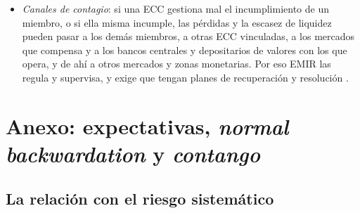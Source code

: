 \documentclass[11pt]{article}
\begin{document}
\begin{itemize}
  \begin{enumerate}
  \item el margen inicial del incumplidor y su aportación al fondo de garantía: «quien incumple paga», lo que reduce el riesgo moral;
  \item una parte del capital propio de la ECC (\emph{skin in the game}), que alinea sus incentivos con los de los miembros;
  \item las aportaciones al fondo de garantía de los miembros cumplidores: la mutualización del riesgo, que reduce el apetito por el riesgo de contrapartida;
  \item y, al final, el resto del capital y las herramientas de recuperación de la ECC.
  \end{enumerate}
\item \emph{Canales de contagio}: si una ECC gestiona mal el incumplimiento de un miembro, o si ella misma incumple, las pérdidas y la escasez de liquidez pueden pasar a los demás miembros, a otras ECC vinculadas, a los mercados que compensa y a los bancos centrales y depositarios de valores con los que opera, y de ahí a otros mercados y zonas monetarias. Por eso EMIR las regula y supervisa, y exige que tengan planes de recuperación y resolución\nocite{NunezValdeolivas2019CCP} .
\end{itemize}

\begin{infografia}[tbp]
\centering
\caption{Miembros y clientes de una cámara de contrapartida central}\label{figu:ccp-miembros}
\end{infografia}

\begin{infografia}[tbp]
\centering
\caption{La cascada de recursos de una cámara ante el incumplimiento de un miembro}\label{figu:ccp-cascada}
\end{infografia}

\section{Anexo: expectativas, \emph{normal backwardation} y \emph{contango}}\label{anexo:contango}

\subsection{La relación con el riesgo sistemático}
\end{document}
